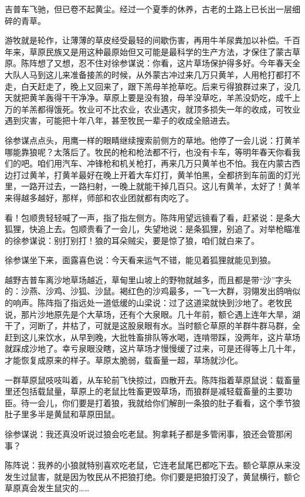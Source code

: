 \par 吉普车飞驰，但已卷不起黄尘。经过一个夏季的休养，古老的土路上已长出一层细碎的青草。
\par 游牧就是轮作，让薄薄的草皮经受最轻的间歇伤害，再用牛羊尿粪加以补偿。千百年来，草原民族又是用这种最原始但又可能是最科学的生产方法，才保住了蒙古草原。陈阵想了又想，忍不住对徐参谋说：你看，这片草场保护得多好。今年春天全大队人马到这儿来准备接羔的时候，从外蒙古冲过来几万只黄羊，人用枪打都打不走，白天赶走了，晚上又回来了，跟下羔母羊抢草吃。后来亏得狼群过来了，没几天就把黄羊轰得干干净净。草原上要是没有狼，母羊没草吃，羊羔没奶吃，成千上万的羊羔都得饿死。牧业可不比农业，农业遇灾，就顶多损失一年的收成，可牧业遇到灾害，可能把十年八年，甚至牧民一辈子的收成全赔进去。
\par 徐参谋点点头，用鹰一样的眼睛继续搜索前侧方的草地。他停了一会儿说：打黄羊哪能靠狼呢？太落后了。牧民的枪和枪法都不行，也没有卡车，等明年春天你看我们的吧。咱们用汽车、冲锋枪和机关枪打，再来几万只黄羊也不怕。我在内蒙古西边打过黄羊，打黄羊最好在晚上开着大车灯打，黄羊怕黑，全都挤到车前面的灯光里，一路开过去，一路扫射，一晚上就能干掉几百只。这儿有黄羊，太好了！黄羊来得越多越好，那样，师部和农业团就都有肉吃了。
\par 看！包顺贵轻轻喊了一声，指了指左侧方。陈阵用望远镜看了看，赶紧说：是条大狐狸，快追上去。包顺贵看了一会儿，失望地说：是条狐狸，别追了。对举枪瞄准的徐参谋说：别打别打！狼的耳朵贼尖，要是惊了狼，咱们就白来了。
\par 徐参谋坐下来，面露喜色说：今天看来运气不错，能见着狐狸就能见到狼。
\par 越野吉普车离沙地草场越近，草甸里山坡上的野物就越多，而且都是带“沙”字头的：沙燕、沙鸡、沙狐、沙鼠。褐红色的沙鸡最多，一飞一大群，羽翎发出鸽哨似的响声。陈阵指了指远处一道低缓的山梁说：过了这道梁就快到沙地了。老牧民说，那片沙地原先是个大草场，还有个大泉眼。几十年前，额仑遇上连年大旱，湖干了，河断了，井枯了，可就是这股泉眼有水。当时额仑草原的羊群牛群马群，全赶到这儿来饮水，从早到晚，大批牲畜排队等水喝，连啃带踩，没两年，这片草场就踩成沙地了。幸亏泉眼没瞎，这片草场才慢慢缓了过来，可是还得等上几十年，才能恢复成原来的样子。草原太脆弱，载畜量一超，草场就沙化。
\par 一群草原鼠吱吱叫着，从车轮前飞快掠过，四散开去。陈阵指着草原鼠说：载畜量里还包括载鼠量，草原上的老鼠比牲畜更毁草场，而狼群是减轻载畜量的主要功臣。待一会儿，你们要是打着狼，我就给你们解剖一条狼的肚子看看，这个季节狼肚子里多半是黄鼠和草原田鼠。
\par 徐参谋说：我还真没听说过狼会吃老鼠。狗拿耗子都是多管闲事，狼还会管那闲事？
\par 陈阵说：我养的小狼就特别喜欢吃老鼠，它连老鼠尾巴都吃下去。额仑草原从来没发生过鼠害，就是因为牧民从不把狼打绝。你们要是把狼打没了，黄鼠横行，额仑草原真会发生鼠灾的……
